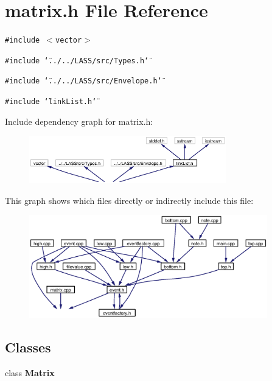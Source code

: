 \section{matrix.h File Reference}
\label{matrix_8h}
{\tt \#include $<$vector$>$}\par
{\tt \#include \char`\"{}../../LASS/src/Types.h\char`\"{}}\par
{\tt \#include \char`\"{}../../LASS/src/Envelope.h\char`\"{}}\par
{\tt \#include \char`\"{}link\-List.h\char`\"{}}\par


Include dependency graph for matrix.h:\begin{figure}[H]
\begin{center}
\leavevmode
\includegraphics[width=242pt]{matrix_8h__incl}
\end{center}
\end{figure}


This graph shows which files directly or indirectly include this file:\begin{figure}[H]
\begin{center}
\leavevmode
\includegraphics[width=293pt]{matrix_8h__dep__incl}
\end{center}
\end{figure}
\subsection*{Classes}
\begin{CompactItemize}
\item 
class {\bf Matrix}
\end{CompactItemize}
